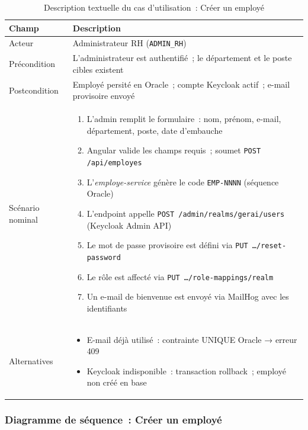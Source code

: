 \begin{table}[H]
\centering
\caption{Description textuelle du cas d'utilisation~: Créer un employé}
\label{tab:uc_emp_desc}
\begin{tabularx}{\textwidth}{|l|L|}
\hline
{}\textbf{Champ} & \textbf{Description} \\\hline
{}Acteur & Administrateur RH (\texttt{ADMIN\_RH}) \\\hline
Précondition & L'administrateur est authentifié~; le département et le poste cibles existent \\\hline
{}Postcondition & Employé persité en Oracle~; compte Keycloak actif~; e-mail provisoire envoyé \\\hline
Scénario nominal &
\begin{enumerate}[leftmargin=*,nosep]
  \item L'admin remplit le formulaire~: nom, prénom, e-mail, département, poste, date d'embauche
  \item Angular valide les champs requis~; soumet \texttt{POST /api/employes}
  \item L'\textit{employe-service} génère le code \texttt{EMP-NNNN} (séquence Oracle)
  \item L'endpoint appelle \texttt{POST /admin/realms/gerai/users} (Keycloak Admin API)
  \item Le mot de passe provisoire est défini via \texttt{PUT …/reset-password}
  \item Le rôle est affecté via \texttt{PUT …/role-mappings/realm}
  \item Un e-mail de bienvenue est envoyé via MailHog avec les identifiants
\end{enumerate} \\\hline
{}Alternatives &
\begin{itemize}[leftmargin=*,nosep]
  \item E-mail déjà utilisé~: contrainte UNIQUE Oracle → erreur 409
  \item Keycloak indisponible~: transaction rollback~; employé non créé en base
\end{itemize} \\\hline
\end{tabularx}
\end{table}

\subsubsection*{Diagramme de séquence~: Créer un employé}

